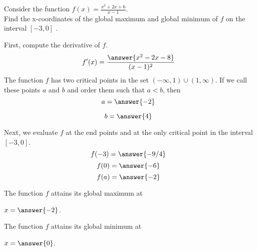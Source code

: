 \documentclass{ximera}
\author{Steven Gubkin\ Nela Lakos}
\begin{document}
\begin{exercise}

Consider the function $f(x) =\frac{x^2+2x+6}{x-1}$. \\
Find the x-coordinates of the global maximum and global minimum of $f$ on the interval $ [-3,0]$ .
\begin{hint}
First, compute the derivative of $f$.
$$
f'(x) = \frac{\answer{x^2-2x-8}}{(x-1)^2}
$$
The function $f$ has two critical points in the set $(-\infty,1)\cup (1,\infty)$. 
 If we call these points $a$ and $b$ and order them such
that $a < b $, then
$$
a = \answer{-2}
$$

$$
b=\answer{4}
$$
\end {hint}

\begin{hint}

Next, we evaluate $f$ at the end points and at  the only critical point in the interval $ [-3,0]$.
$$
f(-3) = \answer{-9/4}
$$
$$
f(0)=\answer{-6}
$$
$$
f(a)=\answer{-2}
$$
\end {hint}

The function $f$ attains its global maximum at	
\begin{prompt}
$x=\answer{-2}$.
\end{prompt}
The function $f$ attains its global minimum at	
\begin{prompt}
$x=\answer{0}$.
\end{prompt}
\end{exercise}
\end{document}
